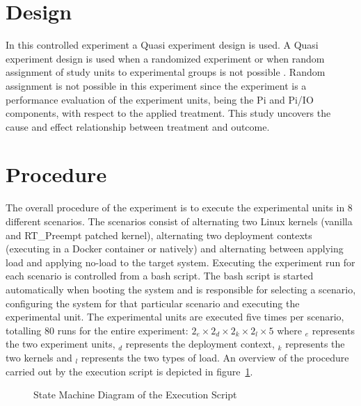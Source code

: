 \section{Design}
In this controlled experiment a Quasi experiment design is used. A Quasi experiment design is used when a randomized experiment or when random assignment of study units to experimental groups is not possible \cite{kampenes}. Random assignment is not possible in this experiment since the experiment is a performance evaluation of the experiment units, being the Pi and Pi/IO components, with respect to the applied treatment. This study uncovers the cause and effect relationship between treatment and outcome. 

\section{Procedure}%
The overall procedure of the experiment is to execute the experimental units in 8 different scenarios. The scenarios consist of alternating two Linux kernels (vanilla and RT\_Preempt patched kernel), alternating two deployment contexts (executing in a Docker container or natively) and alternating between applying load and applying no-load to the target system. Executing the experiment run for each scenario is controlled from a bash script. The bash script is started automatically when booting the system and is responsible for selecting a scenario, configuring the system for that particular scenario and executing the experimental unit. The experimental units are executed five times per scenario, totalling 80 runs for the entire experiment: \(2_{e} \times 2_{d} \times{} 2_{k}  \times{} 2_{l} \times{} 5 \) where $_{e}$ represents the two experiment units, $_{d}$ represents the deployment context, $_{k}$ represents the two kernels and $_{l}$ represents the two types of load. An overview of the procedure carried out by the execution script is depicted in figure~\ref{procedure-state}.


\begin{figure}[ht]
\centering
\caption{State Machine Diagram of the Execution Script }
\label{procedure-state}
\end{figure}

